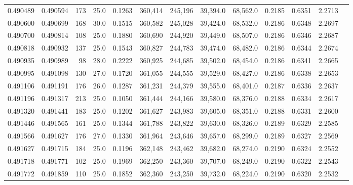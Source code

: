 \begin{tabular}{rrrrrrrrrrrrr}
0.490489 & 0.490594 &   173 & 25.0 &                                     0.1263 & 360,414 & 245,196 &  39,394.0 &  68,562.0 & 0.2185 & 0.6351 & 2.2713 \\
0.490600 & 0.490699 &   168 & 30.0 &                                     0.1515 & 360,582 & 245,028 &  39,424.0 &  68,532.0 & 0.2186 & 0.6348 & 2.2697 \\
0.490700 & 0.490814 &   108 & 25.0 &                                     0.1880 & 360,690 & 244,920 &  39,449.0 &  68,507.0 & 0.2186 & 0.6346 & 2.2687 \\
0.490818 & 0.490932 &   137 & 25.0 &                                     0.1543 & 360,827 & 244,783 &  39,474.0 &  68,482.0 & 0.2186 & 0.6344 & 2.2674 \\
0.490935 & 0.490989 &    98 & 28.0 &                                     0.2222 & 360,925 & 244,685 &  39,502.0 &  68,454.0 & 0.2186 & 0.6341 & 2.2665 \\
0.490995 & 0.491098 &   130 & 27.0 &                                     0.1720 & 361,055 & 244,555 &  39,529.0 &  68,427.0 & 0.2186 & 0.6338 & 2.2653 \\
0.491106 & 0.491191 &   176 & 26.0 &                                     0.1287 & 361,231 & 244,379 &  39,555.0 &  68,401.0 & 0.2187 & 0.6336 & 2.2637 \\
0.491196 & 0.491317 &   213 & 25.0 &                                     0.1050 & 361,444 & 244,166 &  39,580.0 &  68,376.0 & 0.2188 & 0.6334 & 2.2617 \\
0.491320 & 0.491441 &   183 & 25.0 &                                     0.1202 & 361,627 & 243,983 &  39,605.0 &  68,351.0 & 0.2188 & 0.6331 & 2.2600 \\
0.491446 & 0.491565 &   161 & 25.0 &                                     0.1344 & 361,788 & 243,822 &  39,630.0 &  68,326.0 & 0.2189 & 0.6329 & 2.2585 \\
0.491566 & 0.491627 &   176 & 27.0 &                                     0.1330 & 361,964 & 243,646 &  39,657.0 &  68,299.0 & 0.2189 & 0.6327 & 2.2569 \\
0.491627 & 0.491715 &   184 & 25.0 &                                     0.1196 & 362,148 & 243,462 &  39,682.0 &  68,274.0 & 0.2190 & 0.6324 & 2.2552 \\
0.491718 & 0.491771 &   102 & 25.0 &                                     0.1969 & 362,250 & 243,360 &  39,707.0 &  68,249.0 & 0.2190 & 0.6322 & 2.2543 \\
0.491772 & 0.491859 &   110 & 25.0 &                                     0.1852 & 362,360 & 243,250 &  39,732.0 &  68,224.0 & 0.2190 & 0.6320 & 2.2532 \\

\end{tabular}
